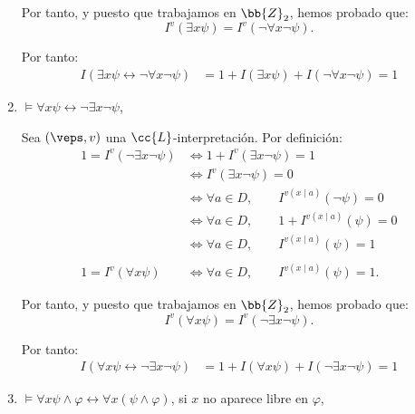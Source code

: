 \begin{ejercicio}
\begin{enumerate}
        Por tanto, y puesto que trabajamos en $\bb{Z}_2$, hemos probado que:
        \begin{equation*}
            I^v(\exists x \psi) =I^v(\neg \forall x \neg \psi).
        \end{equation*}

        Por tanto:
        \begin{align*}
            I( \exists x \psi \leftrightarrow \neg \forall x \neg \psi)
            &= 1+I(\exists x \psi)+I(\neg \forall x \neg \psi)=1
        \end{align*}
        \item $\models \forall x \psi \leftrightarrow \neg \exists x \neg \psi$,
        
        Sea $(\veps,v)$ una $\cc{L}$-interpretación. Por definición:
        \begin{align*}
            1 = I^v(\neg \exists x \neg \psi)
            &\iff 1+I^v(\exists x \neg \psi) = 1\\
            &\iff I^{v}( \exists x \neg \psi) = 0\\
            &\iff \forall a\in D,\qquad I^{v(x\mid a)}(\neg \psi) = 0\\
            &\iff \forall a\in D,\qquad 1+I^{v(x\mid a)}(\psi) = 0\\
            &\iff \forall a\in D,\qquad I^{v(x\mid a)}(\psi) = 1\\\\
            1 = I^v(\forall x \psi)
            &\iff \forall a\in D,\qquad I^{v(x\mid a)}(\psi) = 1.
        \end{align*}

        Por tanto, y puesto que trabajamos en $\bb{Z}_2$, hemos probado que:
        \begin{equation*}
            I^v(\forall x \psi) =I^v(\neg \exists x \neg \psi).
        \end{equation*}

        Por tanto:
        \begin{align*}
            I( \forall x \psi \leftrightarrow \neg \exists x \neg \psi)
            &= 1+I(\forall x \psi)+I(\neg \exists x \neg \psi)=1
        \end{align*}
        \item $\models \forall x \psi \wedge \varphi \leftrightarrow \forall x(\psi \wedge \varphi)$, si $x$ no aparece libre en $\varphi$,
        

\end{enumerate}
\end{ejercicio}
